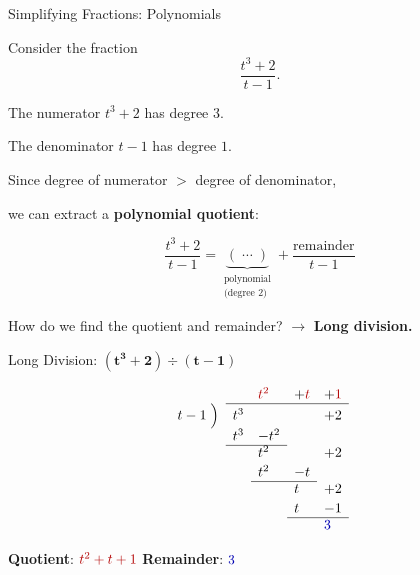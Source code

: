 \documentclass[10pt]{beamer}
\theoremstyle{definition}
\newcommand{\x}[1]{\alert{\textbf{#1}}}
\newcommand{\rd}[1]{{\color{red!70!black}#1}}
\newcommand{\bl}[1]{{\color{blue!70!black}#1}}
\begin{document}
\begin{frame}{Simplifying Fractions: Polynomials}

Consider the fraction
$$\frac{t^3 + 2}{t - 1}.$$

\vfill

The numerator $t^3 + 2$ has degree $3$.

The denominator $t - 1$ has degree $1$.

\vfill

Since degree of numerator $>$ degree of denominator,

we can extract a \x{polynomial quotient}:

\vfill
$$\frac{t^3 + 2}{t - 1} = \underbrace{(\;\cdots\;)}_{\substack{\text{polynomial}\\\text{(degree } 2\text{)}}} + \frac{\text{remainder}}{t - 1}$$

\vfill

How do we find the quotient and remainder? $\to$ \x{Long division.}

\vfill
\end{frame}


\begin{frame}{Long Division: $\boldsymbol{(t^3 + 2) \div (t - 1)}$}

\vfill

$$\begin{array}{rllll}
&&{\color{red!70!black} t^2}&+{\color{red!70!black}t}&+{\color{red!70!black}1}\\
    \cline{2-5}
    t-1 \;\Big)& t^3 &  &  & +2 \\[2pt]
    & t^3 & -t^2 &  & \\
    \cline{2-3}
    &  & t^2 &  & +2\\[2pt]
    &   & t^2 & -t & \\
    \cline{3-4}
    &   &  & t & +2 \\[2pt]
    &   &     & t & -1 \\
    \cline{4-5}
    &   &     &  & {\color{blue!70!black}3} \\
\end{array}$$

\vfill

\x{Quotient}: $\rd{t^2 + t + 1}$ \hfill
\x{Remainder}: $\bl{3}$

\vfill
\end{frame}
\end{document}
